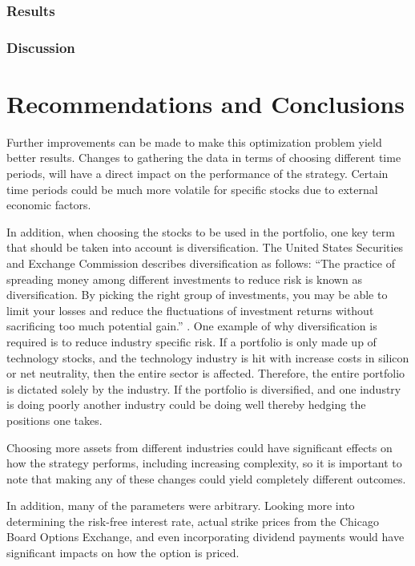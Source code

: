 \documentclass[12pt]{article}
\begin{document}
\subsubsection{Results}

\subsubsection{Discussion}


\section{Recommendations and Conclusions}
Further improvements can be made to make this optimization problem yield better results. Changes to gathering the data in terms of choosing different time periods, will have a direct impact on the performance of the strategy. Certain time periods could be much more volatile for specific stocks due to external economic factors. 

In addition, when choosing the stocks to be used in the portfolio, one key term that should be taken into account is diversification. The United States Securities and Exchange Commission describes diversification as follows: “The practice of spreading money among different investments to reduce risk is known as diversification. By picking the right group of investments, you may be able to limit your losses and reduce the fluctuations of investment returns without sacrificing too much potential gain.” \cite{diversity}.  One example of why diversification is required is to reduce industry specific risk. If a portfolio is only made up of technology stocks, and the technology industry is hit with increase costs in silicon or net neutrality, then the entire sector is affected. Therefore, the entire portfolio is dictated solely by the industry. If the portfolio is diversified, and one industry is doing poorly another industry could be doing well thereby hedging the positions one takes. 

Choosing more assets from different industries could have significant effects on how the strategy performs, including increasing complexity, so it is important to note that making any of these changes could yield completely different outcomes.

In addition, many of the parameters were arbitrary. Looking more into determining the risk-free interest rate, actual strike prices from the Chicago Board Options Exchange, and even incorporating dividend payments would have significant impacts on how the option is priced. 
	
\end{document}
